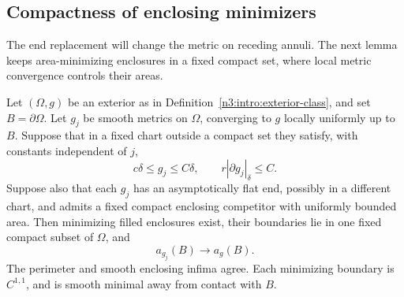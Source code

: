 \subsection{Compactness of enclosing minimizers}

The end replacement will change the metric on receding annuli.  The next
lemma keeps area-minimizing enclosures in a fixed compact set, where local
metric convergence controls their areas.

\begin{lemma}
\label{n3:reduction:area-compactness}
Let $(\Omega,g)$ be an exterior as in
Definition~\ref{n3:intro:exterior-class}, and set $B=\partial\Omega$.
Let $g_j$ be smooth metrics on $\Omega$, converging to $g$
locally uniformly up to $B$.  Suppose that in a fixed chart outside a
compact set they satisfy, with constants independent of $j$,
\begin{equation}
 \label{n3:reduction:area-geometry}
 c\delta\le g_j\le C\delta,\qquad r|\partial g_j|_\delta\le C.
\end{equation}
Suppose also that each $g_j$ has an asymptotically flat end, possibly
in a different chart, and admits a fixed compact enclosing competitor
with uniformly bounded area.  Then minimizing filled enclosures exist,
their boundaries lie in one fixed compact subset of $\Omega$, and
\[
 a_{g_j}(B)\longrightarrow a_g(B).
\]
The perimeter and smooth enclosing infima agree.  Each minimizing
boundary is $C^{1,1}$, and is smooth minimal away from contact with $B$.
\end{lemma}

